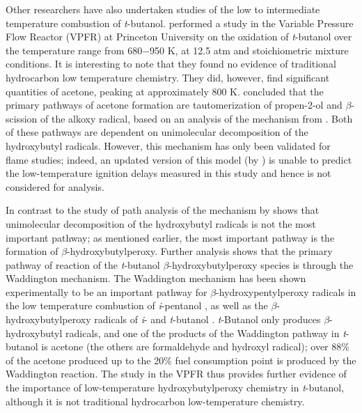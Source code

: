 \documentclass[12pt, letterpaper]{article}
\begin{document}
Other researchers have also undertaken studies of the low to intermediate
temperature combustion of \textit{t}-butanol. \textcite{Lefkowitz2012}
performed a study in the Variable Pressure Flow Reactor (VPFR) at Princeton
University on the oxidation of \textit{t}-butanol over the temperature range
from 680−950 K, at 12.5 atm and stoichiometric mixture conditions. It is
interesting to note that they found no evidence of traditional hydrocarbon
low temperature chemistry. They did, however, find significant quantities of
acetone, peaking at approximately 800 K. \textcite{Lefkowitz2012} concluded
that the primary pathways of acetone formation are tautomerization of
propen-2-ol and $\beta$-scission of the alkoxy radical, based on an analysis
of the mechanism from \textcite{Grana2010}. Both of these pathways are
dependent on unimolecular decomposition of the hydroxybutyl radicals. However,
this mechanism has only been validated for flame studies; indeed, an updated
version of this model (by \textcite{Frassoldati2012}) is unable to predict the
low-temperature ignition delays measured in this study and hence is not
considered for analysis.

In contrast to the study of \textcite{Lefkowitz2012} path analysis of the
mechanism by \textcite{Sarathy2012} shows that unimolecular decomposition
of the hydroxybutyl radicals is not the most important pathway; as mentioned
earlier, the most important pathway is the formation of
$\beta$-hydroxybutylperoxy. Further analysis shows that the primary pathway of
reaction of the \textit{t}-butanol $\beta$-hydroxybutylperoxy species is
through the Waddington mechanism. The Waddington mechanism has been shown
experimentally to be an important pathway for $\beta$-hydroxypentylperoxy
radicals in the low temperature combustion of \textit{i}-pentanol
\cite{Welz2012}, as well as the $\beta$-hydroxybutylperoxy radicals of
\textit{i}- and \textit{t}-butanol \cite{Welz2013b}. \textit{t}-Butanol only
produces $\beta$-hydroxybutyl radicals, and one of the products of the
Waddington pathway in \textit{t}-butanol is acetone (the others are
formaldehyde and hydroxyl radical); over 88\% of the acetone produced up to the
20\% fuel consumption point is produced by the Waddington reaction. The study
in the VPFR thus provides further evidence of the importance of low-temperature
hydroxybutylperoxy chemistry in \textit{t}-butanol, although it is not
traditional hydrocarbon low-temperature chemistry.
\end{document}
